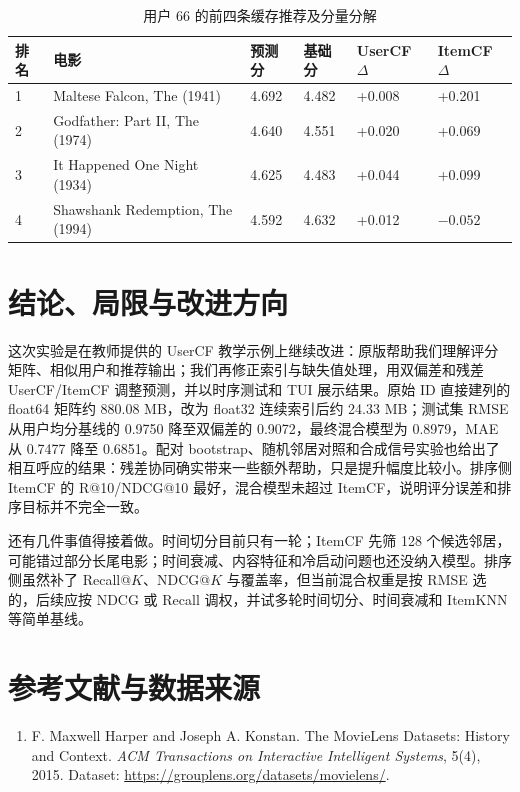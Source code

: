 \documentclass[10pt,a4paper]{article}
\newcommand{\term}[1]{\textbf{\color{navy}#1}}
\begin{document}
\begin{table}[htbp]
\centering
\small
\caption{用户 66 的前四条缓存推荐及分量分解}\label{tab:user66}
\begin{tabularx}{\textwidth}{P{8mm}Y P{14mm}P{14mm}P{18mm}P{18mm}}
\toprule
\term{排名} & \term{电影} & \term{预测分} & \term{基础分} & \term{UserCF $\Delta$} & \term{ItemCF $\Delta$}\\
 & Maltese Falcon, The (1941) & 4.692 & 4.482 & +0.008 & +0.201\\
2 & Godfather: Part II, The (1974) & 4.640 & 4.551 & +0.020 & +0.069\\
3 & It Happened One Night (1934) & 4.625 & 4.483 & +0.044 & +0.099\\
4 & Shawshank Redemption, The (1994) & 4.592 & 4.632 & +0.012 & $-0.052$\\
\bottomrule
\end{tabularx}
\end{table}

\section{结论、局限与改进方向}\label{sec:future}
这次实验是在教师提供的 UserCF 教学示例上继续改进：原版帮助我们理解评分矩阵、相似用户和推荐输出；我们再修正索引与缺失值处理，用双偏差和残差 UserCF/ItemCF 调整预测，并以时序测试和 TUI 展示结果。原始 ID 直接建列的 float64 矩阵约 880.08 MB，改为 float32 连续索引后约 24.33 MB；测试集 RMSE 从用户均分基线的 0.9750 降至双偏差的 0.9072，最终混合模型为 0.8979，MAE 从 0.7477 降至 0.6851。配对 bootstrap、随机邻居对照和合成信号实验也给出了相互呼应的结果：残差协同确实带来一些额外帮助，只是提升幅度比较小。排序侧 ItemCF 的 R@10/NDCG@10 最好，混合模型未超过 ItemCF，说明评分误差和排序目标并不完全一致。

还有几件事值得接着做。时间切分目前只有一轮；ItemCF 先筛 128 个候选邻居，可能错过部分长尾电影；时间衰减、内容特征和冷启动问题也还没纳入模型。排序侧虽然补了 Recall@$K$、NDCG@$K$ 与覆盖率，但当前混合权重是按 RMSE 选的，后续应按 NDCG 或 Recall 调权，并试多轮时间切分、时间衰减和 ItemKNN 等简单基线。

\section*{参考文献与数据来源}
\begin{enumerate}[leftmargin=2em,label=\arabic*.]
\item F. Maxwell Harper and Joseph A. Konstan. The MovieLens Datasets: History and Context. \emph{ACM Transactions on Interactive Intelligent Systems}, 5(4), 2015. Dataset: \url{https://grouplens.org/datasets/movielens/}.
\end{enumerate}
\end{document}

